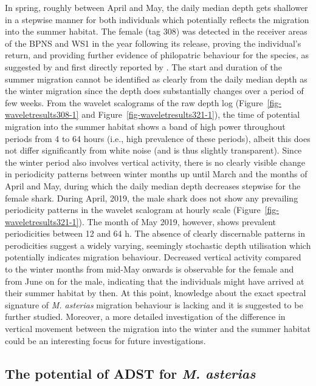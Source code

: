 \documentclass[
  authoryear,
  review,
  3p]{elsarticle}
\begin{document}
In spring, roughly between April and May, the daily median depth gets
shallower in a stepwise manner for both individuals which potentially
reflects the migration into the summer habitat. The female (tag 308) was
detected in the receiver areas of the BPNS and WS1 in the year following
its release, proving the individual's return, and providing further
evidence of philopatric behaviour for the species, as suggested by
\citet{breve_2016} and first directly reported by
\citet{griffiths_2020}. The start and duration of the summer migration
cannot be identified as clearly from the daily median depth as the
winter migration since the depth does substantially changes over a
period of few weeks. From the wavelet scalograms of the raw depth log
(Figure~\ref{fig-waveletresults308-1} and
Figure~\ref{fig-waveletresults321-1}), the time of potential migration
into the summer habitat shows a band of high power throughout periods
from 4 to 64 hours (i.e., high prevalence of these periods), albeit this
does not differ significantly from white noise (and is thus slightly
transparent). Since the winter period also involves vertical activity,
there is no clearly visible change in periodicity patterns between
winter months up until March and the months of April and May, during
which the daily median depth decreases stepwise for the female shark.
During April, 2019, the male shark does not show any prevailing
periodicity patterns in the wavelet scalogram at hourly scale
(Figure~\ref{fig-waveletresults321-1}). The month of May 2019, however,
shows prevalent periodicities between 12 and 64 h. The absence of
clearly discernable patterns in perodicities suggest a widely varying,
seemingly stochastic depth utilisation which potentially indicates
migration behaviour. Decreased vertical activity compared to the winter
months from mid-May onwards is observable for the female and from June
on for the male, indicating that the individuals might have arrived at
their summer habitat by then. At this point, knowledge about the exact
spectral signature of \emph{M. asterias} migration behaviour is lacking
and it is suggested to be further studied. Moreover, a more detailed
investigation of the difference in vertical movement between the
migration into the winter and the summer habitat could be an interesting
focus for future investigations.

\hypertarget{sec-disc-adst}{%
\subsection{\texorpdfstring{The potential of ADST for \emph{M.
asterias}}{The potential of ADST for M. asterias}}\label{sec-disc-adst}}
\end{document}
